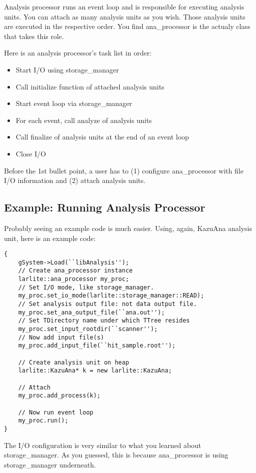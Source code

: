 
Analysis processor runs an event loop and is responsible for executing analysis units. You can attach as many analysis units as you wish. Those analysis units are executed in the respective order. You find {\ttfamily ana\_processor} is the actualy \CPP class that takes this role.

Here is an analysis processor's task list in order:
\begin{itemize}
\item Start I/O using {\ttfamily storage\_manager}
\item Call {\ttfamily initialize} function of attached analysis units
\item Start event loop via {\ttfamily storage\_manager}
\item For each event, call {\ttfamily analyze} of analysis units
\item Call {\ttfamily finalize} of analysis units at the end of an event loop
\item Close I/O
\end{itemize}
Before the 1st bullet point, a user has to (1) configure {\ttfamily ana\_processor} with file I/O information and (2) attach analysis units.

\subsection{Example: Running Analysis Processor}
Probably seeing an example code is much easier. Using, again, {\ttfamily KazuAna} analysis unit, here is an example \CINT code:
\begin{lstlisting}
{
    gSystem->Load(``libAnalysis'');
    // Create ana_processor instance
    larlite::ana_processor my_proc;
    // Set I/O mode, like storage_manager.
    my_proc.set_io_mode(larlite::storage_manager::READ);
    // Set analysis output file: not data output file.
    my_proc.set_ana_output_file(``ana.out'');
    // Set TDirectory name under which TTree resides
    my_proc.set_input_rootdir(``scanner'');
    // Now add input file(s)
    my_proc.add_input_file(``hit_sample.root'');
    
    // Create analysis unit on heap
    larlite::KazuAna* k = new larlite::KazuAna;
    
    // Attach
    my_proc.add_process(k);

    // Now run event loop
    my_proc.run();
}
\end{lstlisting}
The I/O configuration is very similar to what you learned about {\ttfamily storage\_manager}. As you guessed, this is because {\ttfamily ana\_processor} is using {\ttfamily storage\_manager} underneath.

